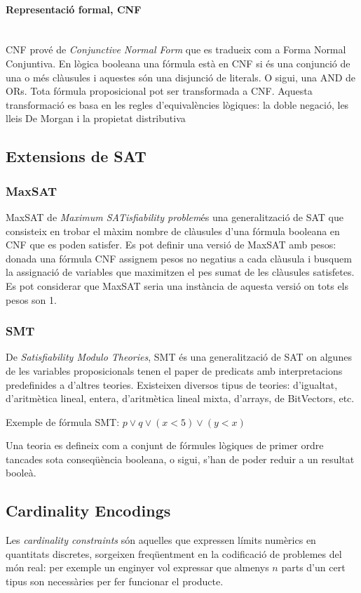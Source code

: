 \documentclass[11pt,a4paper,twoside]{report}
\begin{document}
  \paragraph*{Representació formal, CNF}~\\

  CNF prové de \textit{Conjunctive Normal Form} que es tradueix com a Forma Normal Conjuntiva. En lògica booleana una fórmula està en CNF si és una conjunció de una o més clàusules i aquestes són una disjunció de literals. O sigui, una AND de ORs. 
  Tota fórmula proposicional pot ser transformada a CNF. Aquesta transformació es basa en les regles d'equivalències lògiques: la doble negació, les lleis De Morgan i la propietat distributiva  
  \subsection{Extensions de SAT}
  \subsubsection{MaxSAT}
  MaxSAT de \textit{Maximum SATisfiability problem}és una generalització de SAT que consisteix en trobar el màxim nombre de clàusules d'una fórmula booleana en CNF que es poden satisfer. 
  Es pot definir una versió de MaxSAT amb pesos: donada una fórmula CNF assignem pesos no negatius a cada clàusula i busquem la assignació de variables que maximitzen el pes sumat de les clàusules satisfetes. 
  Es pot considerar que MaxSAT seria una instància de aquesta versió on tots els pesos son 1. 
  \subsubsection{SMT}
  De \textit{Satisfiability Modulo Theories}, SMT és una generalització de SAT on algunes de les variables proposicionals tenen el paper de predicats amb interpretacions predefinides a d'altres teories. Existeixen diversos tipus de teories: d'igualtat, d'aritmètica lineal, entera, d'aritmètica lineal mixta, d'arrays, de BitVectors, etc.
  
  Exemple de fórmula SMT: $p \vee q \vee (x<5) \vee (y<x)$

  Una teoria es defineix com a conjunt de fórmules lògiques de primer ordre tancades sota conseqüència booleana, o sigui, s'han de poder reduir a un resultat booleà. 
  \subsection{Cardinality Encodings}
  \label{card}
  Les \textit{cardinality constraints} són aquelles que expressen límits numèrics en quantitats discretes, sorgeixen freqüentment en la codificació de problemes del món real: per exemple un enginyer vol expressar que almenys $n$ parts d'un cert tipus son necessàries per fer funcionar el producte.
\end{document}
